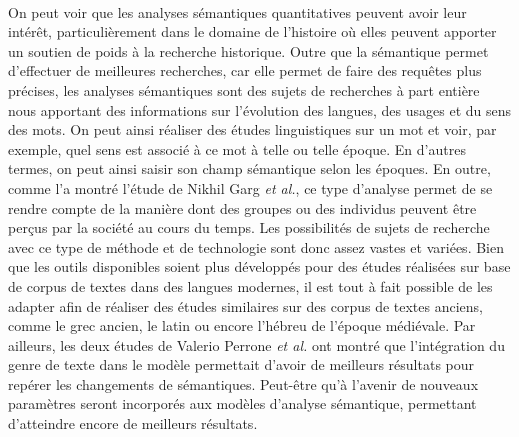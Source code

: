 \documentclass{article}
\begin{document}
\paragraph{}
On peut voir que les analyses sémantiques quantitatives peuvent avoir leur intérêt, particulièrement dans le domaine de l’histoire où elles peuvent apporter un soutien de poids à la recherche historique. Outre que la sémantique permet d'effectuer de meilleures recherches, car elle permet de faire des requêtes plus précises, les analyses sémantiques sont des sujets de recherches à part entière nous apportant des informations sur l’évolution des langues, des usages et du sens des mots. On peut ainsi réaliser des études linguistiques sur un mot et voir, par exemple, quel sens est associé à ce mot à telle ou telle époque. En d'autres termes, on peut ainsi saisir son champ sémantique selon les époques. En outre, comme l’a montré l’étude de Nikhil Garg \textit{et al.}, ce type d’analyse permet de se rendre compte de la manière dont des groupes ou des individus peuvent être perçus par la société au cours du temps. Les possibilités de sujets de recherche avec ce type de méthode et de technologie sont donc assez vastes et variées. Bien que les outils disponibles soient plus développés pour des études réalisées sur base de corpus de textes dans des langues modernes, il est tout à fait possible de les adapter afin de réaliser des études similaires sur des corpus de textes anciens, comme le grec ancien, le latin ou encore l’hébreu de l’époque médiévale. Par ailleurs, les deux études de Valerio Perrone \textit{et al.} ont montré que l’intégration du genre de texte dans le modèle permettait d’avoir de meilleurs résultats pour repérer les changements de sémantiques. Peut-être qu’à l’avenir de nouveaux paramètres seront incorporés aux modèles d’analyse sémantique, permettant d’atteindre encore de meilleurs résultats. 


\end{document}
